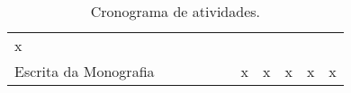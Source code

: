 \begin{table}[h!]
{\begin{tabular}{ l l l l l l l l l l l }
    \multicolumn{1}{p{0.733cm}|}{x \centering } &
    \multicolumn{1}{p{0.733cm}|}{  \centering }
  \\  
  \cline{1-1}\cline{2-2}\cline{3-3}\cline{4-4}\cline{5-5}\cline{6-6}\cline{7-7}\cline{8-8}\cline{9-9}\cline{10-10}\cline{11-11}  
    \multicolumn{1}{|p{4cm}|}{Escrita da Monografia} &
    \multicolumn{1}{p{0.733cm}|}{  \centering } &
    \multicolumn{1}{p{0.733cm}|}{  \centering } &
    \multicolumn{1}{p{0.733cm}|}{  \centering } &
    \multicolumn{1}{p{0.733cm}|}{  \centering } &
    \multicolumn{1}{p{0.733cm}|}{  \centering } &
    \multicolumn{1}{p{0.733cm}|}{x \centering } &
    \multicolumn{1}{p{0.733cm}|}{x \centering } &
    \multicolumn{1}{p{0.733cm}|}{x \centering } &
    \multicolumn{1}{p{0.733cm}|}{x \centering } &
    \multicolumn{1}{p{0.733cm}|}{x \centering }
  \\  
  \hline

 \end{tabular} }
 \caption{Cronograma de atividades.}
\end{table}
